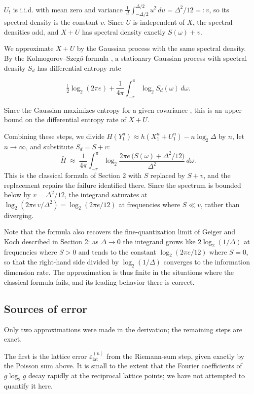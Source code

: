 \documentclass[11pt]{article}
\begin{document}
\(U_t\) is i.i.d. with mean zero and variance \(\frac1\Delta\int_{-\Delta/2}^{\Delta/2}u^2\,du = \Delta^2/12 =: v\), so its spectral density is the constant \(v\). Since \(U\) is independent of \(X\), the spectral densities add, and \(X + U\) has spectral density exactly \(S(\omega) + v\).

We approximate \(X + U\) by the Gaussian process with the same spectral density. By the Kolmogorov--Szegő formula \cite{GrenanderSzego1958}, a stationary Gaussian process with spectral density \(S_d\) has differential entropy rate

\[\tfrac12\log_2(2\pi e) + \frac{1}{4\pi}\int_{-\pi}^{\pi}\log_2 S_d(\omega)\,d\omega.\]

Since the Gaussian maximizes entropy for a given covariance \cite{CoverThomas2006}, this is an upper bound on the differential entropy rate of \(X + U\).

Combining these steps, we divide \(H(Y_1^n) \approx h(X_1^n + U_1^n) - n\log_2\Delta\) by \(n\), let \(n\to\infty\), and substitute \(S_d = S + v\):
\[\boxed{\;\bar H \;\approx\; \frac{1}{4\pi}\int_{-\pi}^{\pi}\log_2\frac{2\pi e\,\big(S(\omega)+\Delta^2/12\big)}{\Delta^2}\,d\omega.\;}\]
This is the classical formula of Section 2 with \(S\) replaced by \(S + v\), and the replacement repairs the failure identified there. Since the spectrum is bounded below by \(v = \Delta^2/12\), the integrand saturates at \(\log_2(2\pi e\,v/\Delta^2) = \log_2(2\pi e/12)\) at frequencies where \(S \ll v\), rather than diverging.

Note that the formula also recovers the fine-quantization limit of Geiger and Koch \cite{GeigerKoch2019} described in Section 2: as \(\Delta \to 0\) the integrand grows like \(2\log_2(1/\Delta)\) at frequencies where \(S > 0\) and tends to the constant \(\log_2(2\pi e/12)\) where \(S = 0\), so that the right-hand side divided by \(\log_2(1/\Delta)\) converges to the information dimension rate. The approximation is thus finite in the situations where the classical formula fails, and its leading behavior there is correct.

\subsection{Sources of error}\label{sources-of-error}

Only two approximations were made in the derivation; the remaining steps are exact.

The first is the lattice error \(\varepsilon_{\mathrm{lat}}^{(n)}\) from the Riemann-sum step, given exactly by the Poisson sum above. It is small to the extent that the Fourier coefficients of \(g\log_2 g\) decay rapidly at the reciprocal lattice points; we have not attempted to quantify it here.
\end{document}
